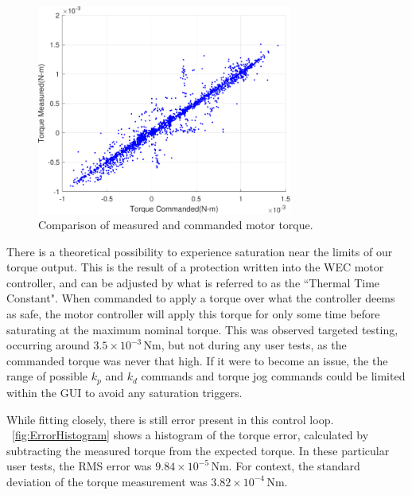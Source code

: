 \documentclass[hardware,article,submit,pdftex,moreauthors]{Definitions/mdpi}
\begin{document}
\begin{figure}[tb]
  \centering
  \includegraphics[width=0.75\textwidth]{diagrams/TorqueCommanded.pdf}
  \caption{Comparison of measured and commanded motor torque.}
  \label{fig:TorqueCommanded}
\end{figure}

There is a theoretical possibility to experience saturation near the limits of our torque output.
This is the result of a protection written into the WEC motor controller, and can be adjusted by what is referred to as the ``Thermal Time Constant".
When commanded to apply a torque over what the controller deems as safe, the motor controller will apply this torque for only some time before saturating at the maximum nominal torque.
This was observed targeted testing, occurring around $3.5\times 10^{-3}$\,Nm, but not during any user tests, as the commanded torque was never that high.
If it were to become an issue, the the range of possible $k_p$ and $k_d$ commands and torque jog commands could be limited within the GUI to avoid any saturation triggers.

While fitting closely, there is still error present in this control loop. 
\figurename~\ref{fig:ErrorHistogram} shows a histogram of the torque error, calculated by subtracting the measured torque from the expected torque.
In these particular user tests, the RMS error was $9.84 \times 10^{-5}$\,Nm.
For context, the standard deviation of the torque measurement was $3.82\times 10^{-4}$\,Nm.
\end{document}
